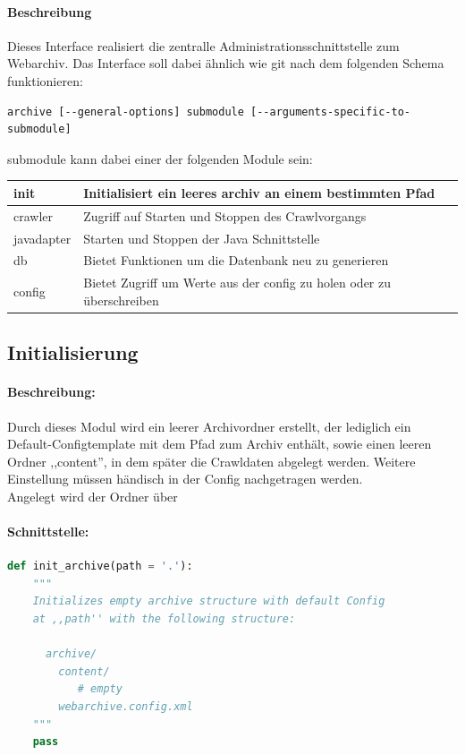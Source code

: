 \paragraph{Beschreibung}
\label{par:beschreibung}
Dieses Interface realisiert die zentralle Administrationsschnittstelle zum Webarchiv. 
Das Interface soll dabei ähnlich wie git nach dem folgenden Schema funktionieren:
\begin{verbatim}
archive [--general-options] submodule [--arguments-specific-to-submodule]
\end{verbatim}
submodule kann dabei einer der folgenden Module sein:
\begin{table}[h]
\centering
\begin{tabular}{|l|l|}
    \hline
init & Initialisiert ein leeres archiv an einem bestimmten Pfad \\
    \hline
crawler & Zugriff auf Starten und Stoppen des Crawlvorgangs \\
    \hline
javadapter & Starten und Stoppen der Java Schnittstelle \\
    \hline
db & Bietet Funktionen um die Datenbank neu zu generieren \\
    \hline
config & Bietet Zugriff um Werte aus der config zu holen oder zu überschreiben \\
    \hline
\end{tabular}
\end{table}

\subsection{Initialisierung} 
\label{sub:initialisierung}
\paragraph{Beschreibung:}
\label{par:beschreibung}
Durch dieses Modul wird ein leerer Archivordner erstellt, der lediglich
ein Default-Configtemplate mit dem Pfad zum Archiv enthält, sowie einen leeren Ordner ,,content'',
in dem später die Crawldaten abgelegt werden.
Weitere Einstellung müssen händisch in der Config nachgetragen werden.
\\
Angelegt wird der Ordner über %
\paragraph{Schnittstelle:}
\label{par:schnittstelle}
\begin{lstlisting}[language=python]
def init_archive(path = '.'):
    """
    Initializes empty archive structure with default Config
    at ,,path'' with the following structure:

      archive/
        content/ 
           # empty
        webarchive.config.xml
    """
    pass
\end{lstlisting}


